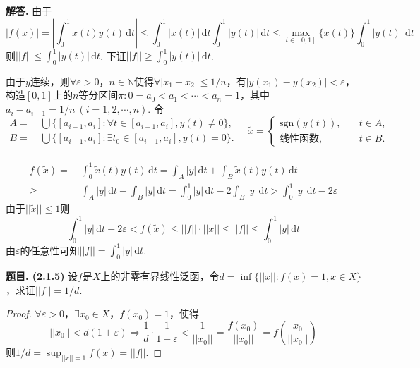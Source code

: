 \documentclass[12pt, a4paper, oneside]{ctexart}
\newcounter{problem}  %
\newenvironment{problem}[1][]{\stepcounter{problem}\par\noindent\textbf{题目\arabic{problem}. #1}}{\smallskip\par}
\newenvironment{solution}[1][]{\par\noindent\textbf{#1解答. }}{\smallskip\par}  %
\let\leq=\leqslant %
\let\geq=\geqslant %
\def\N{\mathbb{N}}          %
\def\d{\mathrm{d}}          %
\def\del{\vspace{-1.5ex}}   %
\begin{document}
\begin{solution}
    由于
    \begin{equation*}
        |f(x)| = \left|\int_0^1x(t)y(t)\,\d t\right|\leq \int_0^1|x(t)|\,\d t\int_0^1|y(t)|\,\d t\leq \max_{t\in[0,1]}\{x(t)\}\int_0^1|y(t)|\,\d t
    \end{equation*}
    则$||f||\leq \int_0^1|y(t)|\,\d t$. 下证$||f||\geq \int_0^1|y(t)|\,\d t$.

    由于$y$连续，则$\forall \varepsilon > 0$，$n\in \N$使得$\forall |x_1-x_2|\leq 1/n$，有$|y(x_1)-y(x_2)| < \varepsilon$，构造$[0,1]$上的$n$等分区间$\pi : 0=a_0 < a_1<\cdots <a_n=1$，其中$a_i-a_{i-1}=1/n\ (i=1,2,\cdots,n)$. 令
    \begin{equation*}
        \begin{aligned}
            A=&\ \bigcup\{[a_{i-1},a_i]:\forall t\in [a_{i-1},a_i],y(t)\neq 0\},\\
            B=&\ \bigcup\{[a_{i-1},a_i]:\exists t_0\in [a_{i-1}, a_i],y(t)=0\}.
        \end{aligned}\quad 
        \tilde{x}=\begin{cases}
            \text{sgn}(y(t)),&\quad t\in A,\\
            \text{线性函数},&\quad t\in B.
        \end{cases}
    \end{equation*}
    \clearpage
    \ \del\del
    \begin{align*}
        f(\tilde{x}) =&\ \int_0^1\tilde{x}(t)y(t)\,\d t = \int_A|y|\,\d t+\int_B\tilde{x}(t)y(t)\,\d t\\
        \geq&\ \int_A|y|\,\d t-\int_B|y|\,\d t = \int_0^1|y|\,\d t-2\int_B|y|\,\d t > \int_0^1|y|\,\d t-2\varepsilon
    \end{align*}
    由于$||\tilde{x}||\leq 1$则
    \begin{equation*}
        \int_0^1|y|\,\d t-2\varepsilon < f(\tilde{x})\leq ||f||\cdot||x||\leq ||f||\leq \int_0^1|y|\,\d t
    \end{equation*}
    由$\varepsilon$的任意性可知$||f|| = \int_0^1|y|\,\d t$.
\end{solution}
\begin{problem}[(2.1.5)]
    设$f$是$X$上的非零有界线性泛函，令$d=\inf\{||x||:f(x)=1,x\in X\}$，求证$||f|| = 1/d$.
\end{problem}
\begin{proof}
    $\forall \varepsilon > 0$，$\exists x_0\in X$，$f(x_0) = 1$，使得
    \begin{equation*}
     ||x_0|| < d(1+\varepsilon)\Rightarrow \frac{1}{d}\cdot\frac{1}{1-\varepsilon}<\frac{1}{||x_0||}=\frac{f(x_0)}{||x_0||}=f\left(\frac{x_0}{||x_0||}\right)
    \end{equation*}
    则$1/d = \sup_{||x||=1}f(x) = ||f||$.
\end{proof}
\end{document}

